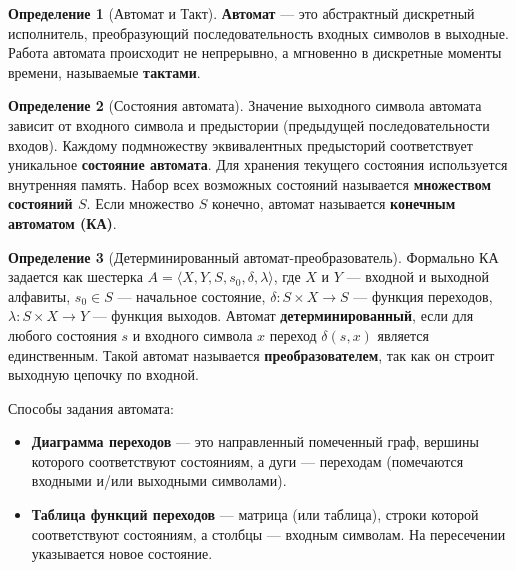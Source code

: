 \documentclass[12pt,a4paper]{article}
\theoremstyle{definition}
\newtheorem{definition}{Определение}
\theoremstyle{plain}
\theoremstyle{remark}
\begin{document}
\begin{definition}[Автомат и Такт]
\textbf{Автомат} — это абстрактный дискретный исполнитель, преобразующий последовательность входных символов в выходные. Работа автомата происходит не непрерывно, а мгновенно в дискретные моменты времени, называемые \textbf{тактами}.
\end{definition}

\begin{definition}[Состояния автомата]
Значение выходного символа автомата зависит от входного символа и предыстории (предыдущей последовательности входов). Каждому подмножеству эквивалентных предысторий соответствует уникальное \textbf{состояние автомата}. Для хранения текущего состояния используется внутренняя память. Набор всех возможных состояний называется \textbf{множеством состояний $S$}.
Если множество $S$ конечно, автомат называется \textbf{конечным автоматом (КА)}.
\end{definition}

\begin{definition}[Детерминированный автомат-преобразователь]
Формально КА задается как шестерка $A = \langle X, Y, S, s_0, \delta, \lambda \rangle$, где $X$ и $Y$ — входной и выходной алфавиты, $s_0 \in S$ — начальное состояние, $\delta: S \times X \to S$ — функция переходов, $\lambda: S \times X \to Y$ — функция выходов.
Автомат \textbf{детерминированный}, если для любого состояния $s$ и входного символа $x$ переход $\delta(s, x)$ является единственным.
Такой автомат называется \textbf{преобразователем}, так как он строит выходную цепочку по входной.
\end{definition}

Способы задания автомата:
\begin{itemize}
    \item \textbf{Диаграмма переходов} — это направленный помеченный граф, вершины которого соответствуют состояниям, а дуги — переходам (помечаются входными и/или выходными символами).
    \item \textbf{Таблица функций переходов} — матрица (или таблица), строки которой соответствуют состояниям, а столбцы — входным символам. На пересечении указывается новое состояние.
\end{itemize}
\end{document}
